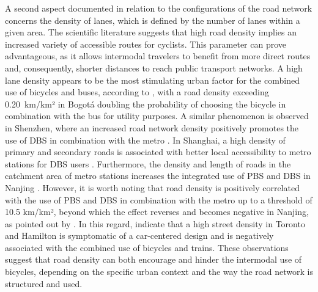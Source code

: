 \begin{refsegment}
A second aspect documented in relation to the configurations of the road network concerns the density of lanes, which is defined by the number of lanes within a given area. The scientific literature suggests that high road density implies an increased variety of accessible routes for cyclists. This parameter can prove advantageous, as it allows intermodal travelers to benefit from more direct routes and, consequently, shorter distances to reach public transport networks. A high lane density appears to be the most stimulating urban factor for the combined use of bicycles and buses, according to \textcolor{blue}{\textcite[219]{cervero_influences_2009}}, with a road density exceeding 0.20~km/km² in Bogotá doubling the probability of choosing the bicycle in combination with the bus for utility purposes. A similar phenomenon is observed in Shenzhen, where an increased road network density positively promotes the use of \acrshort{DBS} in combination with the metro \textcolor{blue}{\autocite[12]{wu_measuring_2019}}. In Shanghai, a high density of primary and secondary roads is associated with better local accessibility to metro stations for \acrshort{DBS} users \textcolor{blue}{\autocite[12]{hu_examining_2022}}. Furthermore, the density and length of roads in the catchment area of metro stations increases the integrated use of \acrshort{PBS} and \acrshort{DBS} in Nanjing \textcolor{blue}{\autocite[14]{chen_what_2022}}. However, it is worth noting that road density is positively correlated with the use of \acrshort{PBS} and \acrshort{DBS} in combination with the metro up to a threshold of 10.5 km/km², beyond which the effect reverses and becomes negative in Nanjing, as pointed out by \textcolor{blue}{\textcite[6]{cheng_comparison_2023}}. In this regard, \textcolor{blue}{\textcite[2171]{chan_factors_2020}} indicate that a high street density in Toronto and Hamilton is symptomatic of a car-centered design and is negatively associated with the combined use of bicycles and trains. These observations suggest that road density can both encourage and hinder the intermodal use of bicycles, depending on the specific urban context and the way the road network is structured and used.%


\end{refsegment}
